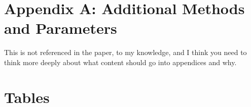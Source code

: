 \documentclass[11pt]{article}
\begin{document}
\section*{Appendix A: Additional Methods and Parameters}
This is not referenced in the paper, to my knowledge, and I think you need to think more deeply about what content should go into appendices and why. 
%
%
%
%

\renewcommand{\theequation}{A\arabic{equation}}
\renewcommand{\thetable}{A\arabic{table}}
\setcounter{equation}{0}  %
\setcounter{figure}{0}
\setcounter{table}{0}

%
%




\newpage{}

\section*{Tables}
\renewcommand{\thetable}{\arabic{table}}
\setcounter{table}{0}
\end{document}
